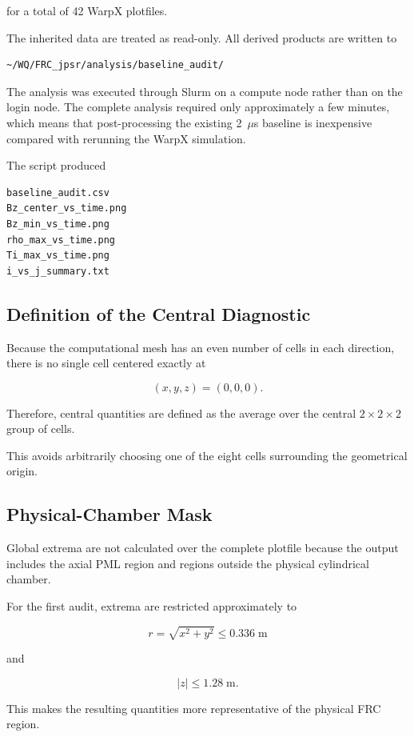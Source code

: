 \documentclass[11pt,a4paper]{article}
\begin{document}
for a total of 42 WarpX plotfiles.

The inherited data are treated as read-only. All derived products are written
to

\begin{lstlisting}
~/WQ/FRC_jpsr/analysis/baseline_audit/
\end{lstlisting}

The analysis was executed through Slurm on a compute node rather than on the
login node. The complete analysis required only approximately a few minutes,
which means that post-processing the existing 2~$\mu$s baseline is inexpensive
compared with rerunning the WarpX simulation.

The script produced

\begin{lstlisting}
baseline_audit.csv
Bz_center_vs_time.png
Bz_min_vs_time.png
rho_max_vs_time.png
Ti_max_vs_time.png
i_vs_j_summary.txt
\end{lstlisting}

\subsection{Definition of the Central Diagnostic}

Because the computational mesh has an even number of cells in each direction,
there is no single cell centered exactly at

\[
(x,y,z)=(0,0,0).
\]

Therefore, central quantities are defined as the average over the central
\(2\times2\times2\) group of cells.

This avoids arbitrarily choosing one of the eight cells surrounding the
geometrical origin.

\subsection{Physical-Chamber Mask}

Global extrema are not calculated over the complete plotfile because the
output includes the axial PML region and regions outside the physical
cylindrical chamber.

For the first audit, extrema are restricted approximately to

\[
r=\sqrt{x^2+y^2}\leq 0.336\;\mathrm{m}
\]

and

\[
|z|\leq 1.28\;\mathrm{m}.
\]

This makes the resulting quantities more representative of the physical FRC
region.
\end{document}

